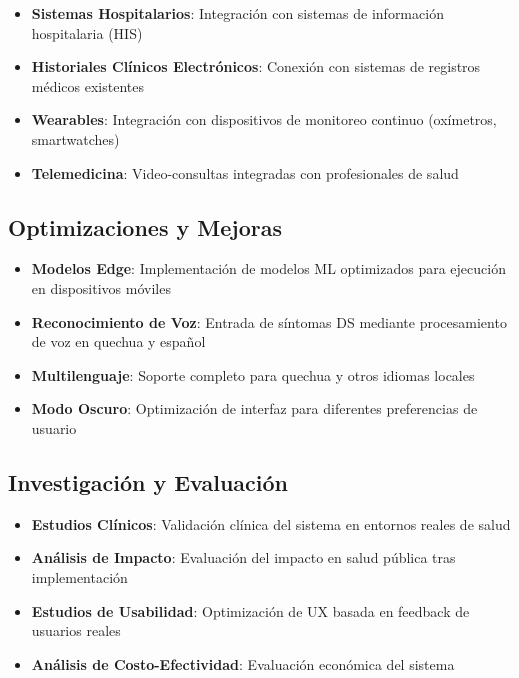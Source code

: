\documentclass[12pt,a4paper]{article}
\begin{document}
\begin{itemize}
    \item \textbf{Sistemas Hospitalarios}: Integración con sistemas de información hospitalaria (HIS)
    \item \textbf{Historiales Clínicos Electrónicos}: Conexión con sistemas de registros médicos existentes
    \item \textbf{Wearables}: Integración con dispositivos de monitoreo continuo (oxímetros, smartwatches)
    \item \textbf{Telemedicina}: Video-consultas integradas con profesionales de salud
\end{itemize}

\subsection{Optimizaciones y Mejoras}

\begin{itemize}
    \item \textbf{Modelos Edge}: Implementación de modelos ML optimizados para ejecución en dispositivos móviles
    \item \textbf{Reconocimiento de Voz}: Entrada de síntomas DS mediante procesamiento de voz en quechua y español
    \item \textbf{Multilenguaje}: Soporte completo para quechua y otros idiomas locales
    \item \textbf{Modo Oscuro}: Optimización de interfaz para diferentes preferencias de usuario
\end{itemize}

\subsection{Investigación y Evaluación}

\begin{itemize}
    \item \textbf{Estudios Clínicos}: Validación clínica del sistema en entornos reales de salud
    \item \textbf{Análisis de Impacto}: Evaluación del impacto en salud pública tras implementación
    \item \textbf{Estudios de Usabilidad}: Optimización de UX basada en feedback de usuarios reales
    \item \textbf{Análisis de Costo-Efectividad}: Evaluación económica del sistema
\end{itemize}
\end{document}
